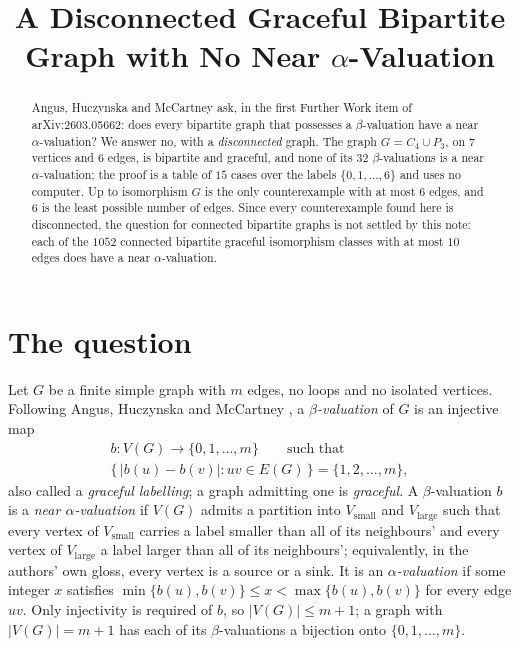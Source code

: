 \documentclass[11pt]{amsart}
\title[A disconnected graceful graph with no near $\alpha$-valuation]
{A Disconnected Graceful Bipartite Graph with No Near $\alpha$-Valuation}
\date{}
\theoremstyle{remark}
\begin{document}
\begin{abstract}
Angus, Huczynska and McCartney ask, in the first Further Work item of
arXiv:2603.05662: does every bipartite graph that possesses a
$\beta$-valuation have a near $\alpha$-valuation? We answer no, with a
\emph{disconnected} graph. The graph
$G=C_4\cup P_3$, on $7$ vertices and $6$ edges, is bipartite and graceful, and
none of its $32$ $\beta$-valuations is a near $\alpha$-valuation; the proof is a
table of $15$ cases over the labels $\{0,1,\ldots,6\}$ and uses no computer.
Up to isomorphism $G$ is the only counterexample with at most $6$ edges, and $6$
is the least possible number of edges. Since every counterexample found here is
disconnected, the question for connected bipartite graphs is not
settled by this note: each of the $1052$ connected bipartite graceful
isomorphism classes with at most $10$ edges does have a near
$\alpha$-valuation.
\end{abstract}

\maketitle

\section{The question}

Let $G$ be a finite simple graph with $m$ edges, no loops and no isolated
vertices. Following Angus, Huczynska and McCartney \cite{AHM}, a
\emph{$\beta$-valuation} of $G$ is an injective map
\begin{gather*}
 b\colon V(G)\longrightarrow\{0,1,\ldots,m\}
 \qquad\text{such that}\\
 \bigl\{\,|b(u)-b(v)| : uv\in E(G)\,\bigr\}=\{1,2,\ldots,m\},
\end{gather*}
also called a \emph{graceful labelling}; a graph admitting one is
\emph{graceful}. A $\beta$-valuation $b$ is a \emph{near $\alpha$-valuation} if
$V(G)$ admits a partition into $V_{\mathrm{small}}$ and $V_{\mathrm{large}}$
such that every vertex of $V_{\mathrm{small}}$ carries a label smaller than all
of its neighbours' and every vertex of $V_{\mathrm{large}}$ a label larger than
all of its neighbours'; equivalently, in the authors' own gloss, every vertex is
a source or a sink. It is an \emph{$\alpha$-valuation} if some integer $x$
satisfies $\min\{b(u),b(v)\}\le x<\max\{b(u),b(v)\}$ for every edge $uv$. Only
injectivity is required of $b$, so $|V(G)|\le m+1$; a graph with $|V(G)|=m+1$ has
each of its $\beta$-valuations a bijection onto $\{0,1,\ldots,m\}$.
\end{document}
